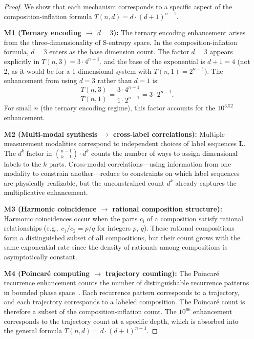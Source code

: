\documentclass[twocolumn,10pt,a4paper]{article}
\theoremstyle{definition}
\theoremstyle{remark}
\begin{document}
\begin{proof}
We show that each mechanism corresponds to a specific aspect of the composition-inflation formula $T(n,d) = d \cdot (d+1)^{n-1}$.

\textbf{M1 (Ternary encoding $\to$ $d = 3$):} The ternary encoding enhancement arises from the three-dimensionality of S-entropy space. In the composition-inflation formula, $d = 3$ enters as the base dimension count. The factor $d = 3$ appears explicitly in $T(n,3) = 3 \cdot 4^{n-1}$, and the base of the exponential is $d + 1 = 4$ (not 2, as it would be for a 1-dimensional system with $T(n,1) = 2^{n-1}$). The enhancement from using $d = 3$ rather than $d = 1$ is:
\begin{equation}
\frac{T(n,3)}{T(n,1)} = \frac{3 \cdot 4^{n-1}}{1 \cdot 2^{n-1}} = 3 \cdot 2^{n-1}.
\end{equation}
For small $n$ (the ternary encoding regime), this factor accounts for the $10^{3.52}$ enhancement.

\textbf{M2 (Multi-modal synthesis $\to$ cross-label correlations):} Multiple measurement modalities correspond to independent choices of label sequences $\mathbf{L}$. The $d^k$ factor in $\binom{n-1}{k-1} \cdot d^k$ counts the number of ways to assign dimensional labels to the $k$ parts. Cross-modal correlations---using information from one modality to constrain another---reduce to constraints on which label sequences are physically realizable, but the unconstrained count $d^k$ already captures the multiplicative enhancement.

\textbf{M3 (Harmonic coincidence $\to$ rational composition structure):} Harmonic coincidences occur when the parts $c_i$ of a composition satisfy rational relationships (e.g., $c_1/c_2 = p/q$ for integers $p$, $q$). These rational compositions form a distinguished subset of all compositions, but their count grows with the same exponential rate since the density of rationals among compositions is asymptotically constant.

\textbf{M4 (Poincar\'{e} computing $\to$ trajectory counting):} The Poincar\'{e} recurrence enhancement counts the number of distinguishable recurrence patterns in bounded phase space~\cite{poincare1890,kac1947}. Each recurrence pattern corresponds to a trajectory, and each trajectory corresponds to a labeled composition. The Poincar\'{e} count is therefore a subset of the composition-inflation count. The $10^{66}$ enhancement corresponds to the trajectory count at a specific depth, which is absorbed into the general formula $T(n,d) = d \cdot (d+1)^{n-1}$.


\end{proof}
\end{document}
